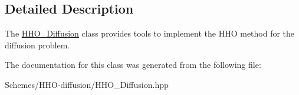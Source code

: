\subsection{Detailed Description}
The \hyperlink{classHArDCore3D_1_1HHO__Diffusion}{H\+H\+O\+\_\+\+Diffusion} class provides tools to implement the H\+HO method for the diffusion problem. 

The documentation for this class was generated from the following file\+:\begin{DoxyCompactItemize}
\item 
Schemes/\+H\+H\+O-\/diffusion/H\+H\+O\+\_\+\+Diffusion.\+hpp\end{DoxyCompactItemize}
